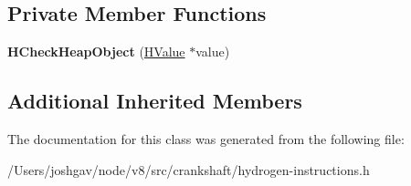 \subsection*{Private Member Functions}
\begin{DoxyCompactItemize}
\item 
{\bfseries H\+Check\+Heap\+Object} (\hyperlink{classv8_1_1internal_1_1_h_value}{H\+Value} $\ast$value)\hypertarget{classv8_1_1internal_1_1_h_check_heap_object_a1d63f5805848f050898de120b733d5aa}{}\label{classv8_1_1internal_1_1_h_check_heap_object_a1d63f5805848f050898de120b733d5aa}

\end{DoxyCompactItemize}
\subsection*{Additional Inherited Members}


The documentation for this class was generated from the following file\+:\begin{DoxyCompactItemize}
\item 
/\+Users/joshgav/node/v8/src/crankshaft/hydrogen-\/instructions.\+h\end{DoxyCompactItemize}
